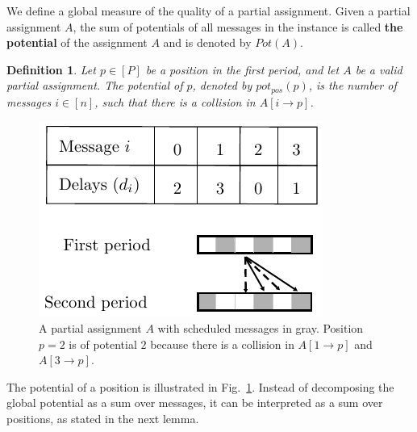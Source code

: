 \documentclass[pdflatex,sn-mathphys,iicol]{sn-jnl}%
\theoremstyle{thmstyleone}%
\theoremstyle{thmstyletwo}%
\theoremstyle{thmstylethree}%
\newtheorem{definition}{Definition}%
\begin{document}
We define a global measure of the quality of a partial assignment. 
Given a partial assignment $A$, the sum of potentials of all messages in the instance is called \textbf{the potential} of the assignment $A$ and is denoted by $Pot(A)$. 


\begin{definition}
Let $p \in [P]$ be a position in the first period, and let $A$ be a valid partial assignment. The potential of $p$, denoted by $pot_{pos}(p)$, is the number of messages $i \in [n]$, such that there is a collision in $A[i \rightarrow p]$. 
\end{definition}

\begin{figure}
\begin{center}
\includegraphics[scale=1]{positionspotential}
\end{center}
\caption{A partial assignment $A$ with scheduled messages in gray. Position $p=2$ is of potential $2$ because there is a collision in $A[1 \rightarrow p]$ and  $A[3 \rightarrow p]$.}
\label{fig:positionpotential}
\end{figure}

The potential of a position is illustrated in Fig.~\ref{fig:positionpotential}. Instead of decomposing the global potential as a sum over messages, it can be interpreted as a sum over positions, as stated in the next lemma.
\end{document}
